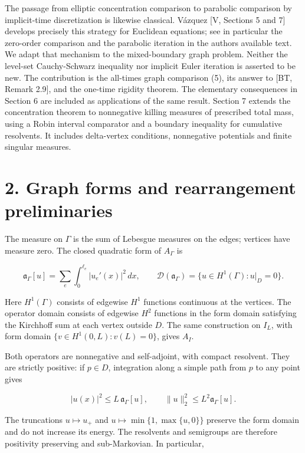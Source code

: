 \documentclass[11pt]{article}
\begin{document}
The passage from elliptic concentration comparison to parabolic
comparison by implicit-time discretization is likewise classical.
Vázquez {[}V, Sections 5 and 7{]} develops precisely this strategy for
Euclidean equations; see in particular the zero-order comparison and the
parabolic iteration in the author\textquotesingle s available text. We
adapt that mechanism to the mixed-boundary graph problem. Neither the
level-set Cauchy-Schwarz inequality nor implicit Euler iteration is
asserted to be new. The contribution is the all-times graph comparison
(5), its answer to {[}BT, Remark 2.9{]}, and the one-time rigidity
theorem. The elementary consequences in Section 6 are included as
applications of the same result. Section 7 extends the concentration
theorem to nonnegative killing measures of prescribed total mass, using
a Robin interval comparator and a boundary inequality for cumulative
resolvents. It includes delta-vertex conditions, nonnegative potentials
and finite singular measures.

\section{2. Graph forms and rearrangement
preliminaries}\label{graph-forms-and-rearrangement-preliminaries}

The measure on \(\Gamma\) is the sum of Lebesgue measures on the edges;
vertices have measure zero. The closed quadratic form of \(A_\Gamma\) is

\[
\mathfrak a_\Gamma[u]=\sum_{e}\int_0^{\ell_e}|u_e'(x)|^2\,dx,
\qquad
\mathcal D(\mathfrak a_\Gamma)
=\{u\in H^1(\Gamma):u|_D=0\}.
\tag{6}
\]

Here \(H^1(\Gamma)\) consists of edgewise \(H^1\) functions continuous
at the vertices. The operator domain consists of edgewise \(H^2\)
functions in the form domain satisfying the Kirchhoff sum at each vertex
outside \(D\). The same construction on \(I_L\), with form domain
\(\{v\in H^1(0,L):v(L)=0\}\), gives \(A_I\).

Both operators are nonnegative and self-adjoint, with compact resolvent.
They are strictly positive: if \(p\in D\), integration along a simple
path from \(p\) to any point gives

\[
|u(x)|^2\le L\,\mathfrak a_\Gamma[u],
\qquad
\|u\|_2^2\le L^2\mathfrak a_\Gamma[u].
\tag{7}
\]

The truncations \(u\mapsto u_+\) and \(u\mapsto\min\{1,\max\{u,0\}\}\)
preserve the form domain and do not increase its energy. The resolvents
and semigroups are therefore positivity preserving and sub-Markovian. In
particular,
\end{document}
